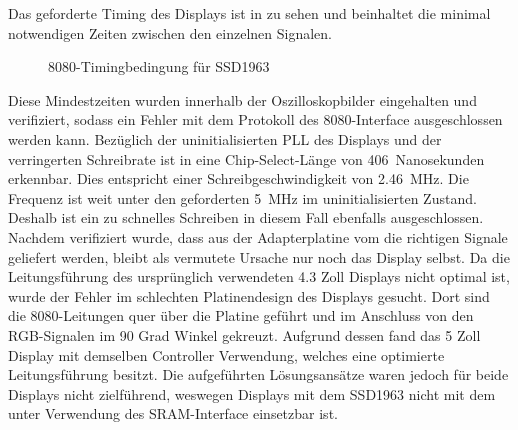 \newpage
Das geforderte Timing des Displays ist in  zu sehen und beinhaltet die minimal notwendigen Zeiten zwischen den einzelnen Signalen.
\begin{figure}[htp]
	\centering
{}
	\caption{8080-Timingbedingung für SSD1963}
	\label{fig:ssd1963_timing_constraints}
\end{figure}\newline
Diese Mindestzeiten wurden innerhalb der Oszilloskopbilder eingehalten und verifiziert, sodass ein Fehler mit dem Protokoll des 8080-Interface ausgeschlossen werden kann. Bezüglich der uninitialisierten PLL des Displays und der verringerten Schreibrate ist in  eine Chip-Select-Länge von 406~Nanosekunden erkennbar. Dies entspricht einer Schreibgeschwindigkeit von 2.46~MHz. Die Frequenz ist weit unter den geforderten 5~MHz im uninitialisierten Zustand. Deshalb ist ein zu schnelles Schreiben in diesem Fall ebenfalls ausgeschlossen. Nachdem verifiziert wurde, dass aus der Adapterplatine vom  die richtigen Signale geliefert werden, bleibt als vermutete Ursache nur noch das Display selbst. Da die Leitungsführung des ursprünglich verwendeten 4.3 Zoll Displays nicht optimal ist, wurde der Fehler im schlechten Platinendesign des Displays gesucht.
Dort sind die 8080-Leitungen quer über die Platine geführt und im Anschluss von den RGB-Signalen im 90 Grad Winkel gekreuzt. Aufgrund dessen fand das 5 Zoll Display mit demselben Controller Verwendung, welches eine optimierte Leitungsführung besitzt.\newline 
Die aufgeführten Lösungsansätze waren jedoch für beide Displays nicht zielführend, weswegen Displays mit dem SSD1963 nicht mit dem  unter Verwendung des SRAM-Interface einsetzbar ist.